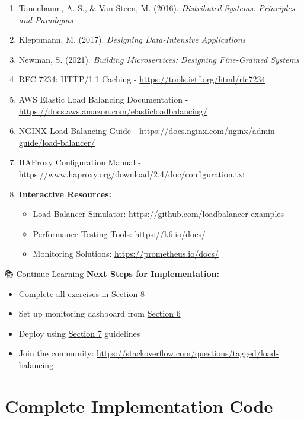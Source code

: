 \documentclass[12pt,a4paper]{article}
\begin{document}
\begin{enumerate}
    \item Tanenbaum, A. S., \& Van Steen, M. (2016). \textit{Distributed Systems: Principles and Paradigms}
    \item Kleppmann, M. (2017). \textit{Designing Data-Intensive Applications}
    \item Newman, S. (2021). \textit{Building Microservices: Designing Fine-Grained Systems}
    \item RFC 7234: HTTP/1.1 Caching - \url{https://tools.ietf.org/html/rfc7234}
    \item AWS Elastic Load Balancing Documentation - \url{https://docs.aws.amazon.com/elasticloadbalancing/}
    \item NGINX Load Balancing Guide - \url{https://docs.nginx.com/nginx/admin-guide/load-balancer/}
    \item HAProxy Configuration Manual - \url{https://www.haproxy.org/download/2.4/doc/configuration.txt}
    \item \textbf{Interactive Resources:}
    \begin{itemize}
        \item Load Balancer Simulator: \url{https://github.com/loadbalancer-examples}
        \item Performance Testing Tools: \url{https://k6.io/docs/}
        \item Monitoring Solutions: \url{https://prometheus.io/docs/}
    \end{itemize}
\end{enumerate}

\begin{infobox}{📚 Continue Learning}
\textbf{Next Steps for Implementation:}
\begin{itemize}
    \item Complete all exercises in \hyperref[sec:exercises]{Section 8}
    \item Set up monitoring dashboard from \hyperref[sec:advanced]{Section 6}
    \item Deploy using \hyperref[sec:deployment]{Section 7} guidelines
    \item Join the community: \url{https://stackoverflow.com/questions/tagged/load-balancing}
\end{itemize}
\end{infobox}

\appendix

\section{Complete Implementation Code}
\end{document}

